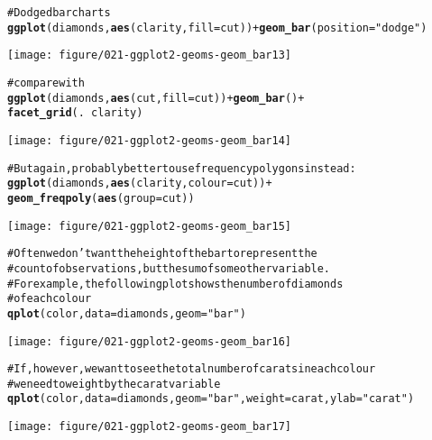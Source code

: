 \documentclass[a4paper,titlepage]{tufte-handout}\usepackage{graphicx, color}
\makeatletter
\def\maxwidth{ %
  \ifdim\Gin@nat@width>\linewidth
    \linewidth
  \else
    \Gin@nat@width
  \fi
}
\newcommand{\hlfunctioncall}[1]{\textcolor[rgb]{0.501960784313725,0,0.329411764705882}{\textbf{#1}}}%
\newcommand{\hlstring}[1]{\textcolor[rgb]{0.6,0.6,1}{#1}}%
\newcommand{\hlcomment}[1]{\textcolor[rgb]{0.180392156862745,0.6,0.341176470588235}{#1}}%
\newenvironment{kframe}{%
 \def\at@end@of@kframe{}%
 \ifinner\ifhmode%
  \def\at@end@of@kframe{\end{minipage}}%
  \begin{minipage}{\columnwidth}%
 \fi\fi%
 \def\FrameCommand##1{\hskip\@totalleftmargin \hskip-\fboxsep
 \colorbox{shadecolor}{##1}\hskip-\fboxsep
     \hskip-\linewidth \hskip-\@totalleftmargin \hskip\columnwidth}%
 \MakeFramed {\advance\hsize-\width
   \@totalleftmargin\z@ \linewidth\hsize
   \@setminipage}}%
 {\par\unskip\endMakeFramed%
 \at@end@of@kframe}
\newenvironment{knitrout}{}{} %
\makeatother
\begin{document}
\begin{knitrout}
\begin{kframe}
\begin{alltt}
\hlcomment{# Dodged bar charts}
\hlfunctioncall{ggplot}(diamonds, \hlfunctioncall{aes}(clarity, fill=cut)) + \hlfunctioncall{geom_bar}(position=\hlstring{"dodge"})
\end{alltt}
\end{kframe}
\texttt{[image: figure/021-ggplot2-geoms-geom\_bar13]} 
\begin{kframe}\begin{alltt}
\hlcomment{# compare with}
\hlfunctioncall{ggplot}(diamonds, \hlfunctioncall{aes}(cut, fill=cut)) + \hlfunctioncall{geom_bar}() +
  \hlfunctioncall{facet_grid}(. ~ clarity)
\end{alltt}
\end{kframe}
\texttt{[image: figure/021-ggplot2-geoms-geom\_bar14]} 
\begin{kframe}\begin{alltt}

\hlcomment{# But again, probably better to use frequency polygons instead:}
\hlfunctioncall{ggplot}(diamonds, \hlfunctioncall{aes}(clarity, colour=cut)) +
  \hlfunctioncall{geom_freqpoly}(\hlfunctioncall{aes}(group = cut))
\end{alltt}
\end{kframe}
\texttt{[image: figure/021-ggplot2-geoms-geom\_bar15]} 
\begin{kframe}\begin{alltt}

\hlcomment{# Often we don't want the height of the bar to represent the}
\hlcomment{# count of observations, but the sum of some other variable.}
\hlcomment{# For example, the following plot shows the number of diamonds}
\hlcomment{# of each colour}
\hlfunctioncall{qplot}(color, data=diamonds, geom=\hlstring{"bar"})
\end{alltt}
\end{kframe}
\texttt{[image: figure/021-ggplot2-geoms-geom\_bar16]} 
\begin{kframe}\begin{alltt}
\hlcomment{# If, however, we want to see the total number of carats in each colour}
\hlcomment{# we need to weight by the carat variable}
\hlfunctioncall{qplot}(color, data=diamonds, geom=\hlstring{"bar"}, weight=carat, ylab=\hlstring{"carat"})
\end{alltt}
\end{kframe}
\texttt{[image: figure/021-ggplot2-geoms-geom\_bar17]} 
\begin{kframe}\begin{alltt}


\end{alltt}
\end{kframe}
\end{knitrout}
\end{document}
